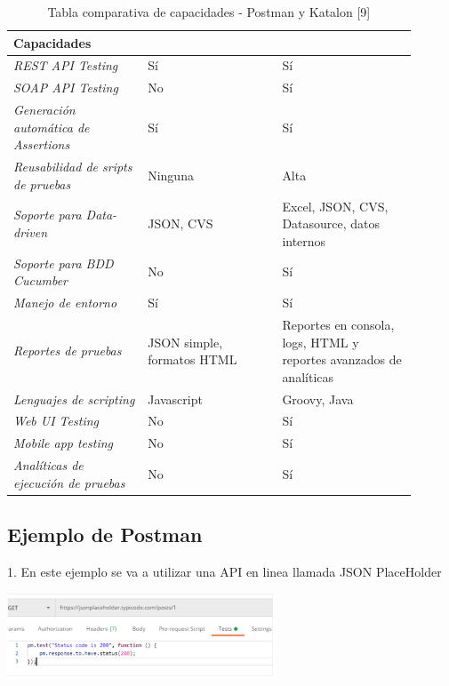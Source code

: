 \documentclass[twoside,twocolumn]{article}
\begin{document}
\begin{table}[]
\begin{tabular}{p{0.3\linewidth} | p{0.3\linewidth} | p{0.3\linewidth}}
\toprule
\textbf{Capacidades}              & \cellcolor[HTML]{FFFFFF}{\color[HTML]{FF6D2A} \textbf{Postman}} & \cellcolor[HTML]{FFFFFF}{\color[HTML]{0EA4DD} \textbf{Katalon}}    \\ \midrule
\textit{REST API Testing}                    & Sí         & Sí           \\
\textit{SOAP API Testing}                    & No         & Sí           \\
\textit{Generación automática de Assertions} & Sí         & Sí           \\
\textit{Reusabilidad de sripts de pruebas}   & Ninguna    & Alta         \\
\textit{Soporte para Data-driven} & JSON, CVS                                                       & Excel, JSON, CVS, Datasource, datos internos                       \\
\textit{Soporte para BDD Cucumber}           & No         & Sí           \\
\textit{Manejo de entorno}                   & Sí         & Sí           \\
\textit{Reportes de pruebas}      & JSON simple, formatos HTML                                      & Reportes en consola, logs, HTML y reportes avanzados de analíticas \\
\textit{Lenguajes de scripting}              & Javascript & Groovy, Java \\
\textit{Web UI Testing}                      & No         & Sí           \\
\textit{Mobile app testing}                  & No         & Sí           \\
\textit{Analíticas de ejecución de pruebas}  & No         & Sí           \\ \bottomrule
\end{tabular}
\caption{Tabla comparativa de capacidades - Postman y Katalon [9]}
\label{tabla1}
\end{table}


\subsection{Ejemplo de Postman}

1. En este ejemplo se va a utilizar una API en linea llamada JSON PlaceHolder

\includegraphics[width=8cm]{Imagenes/1}
\end{document}

